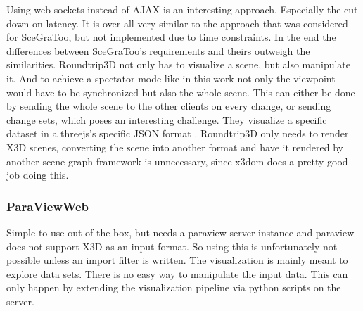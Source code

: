 Using web sockets instead of AJAX is an interesting approach.
\cite{Marion:2012:RCS:2338714.2338721} Especially the cut down on latency. It is
over all very similar to the approach that was considered for SceGraToo, but not
implemented due to time constraints. In the end the differences between
SceGraToo's requirements and theirs outweigh the similarities. \gls{Roundtrip3D} not only
has to visualize a scene, but also manipulate it. And to achieve a spectator mode
like in this work not only the viewpoint would have to be synchronized but also
the whole scene. This can either be done by sending the whole scene to the other
clients on every change, or sending change sets, which poses an interesting
challenge. They visualize a specific dataset in a threejs's specific \gls{JSON} format
\cite{threejs-format}. \gls{Roundtrip3D} only needs to render \gls{X3D} scenes, converting the
scene into another format and have it rendered by another scene graph framework
is unnecessary, since x3dom does a pretty good job doing this.

\subsubsection{ParaViewWeb}
\label{paraviewweb-pvweb}

Simple to use out of the box, but needs a paraview server instance and
paraview does not support \gls{X3D} as an input format. So using this is unfortunately
not possible unless an import filter is written. The visualization is
mainly meant to explore data sets. There is no easy way to manipulate
the input data. This can only happen by extending the visualization
pipeline via python scripts on the server.
